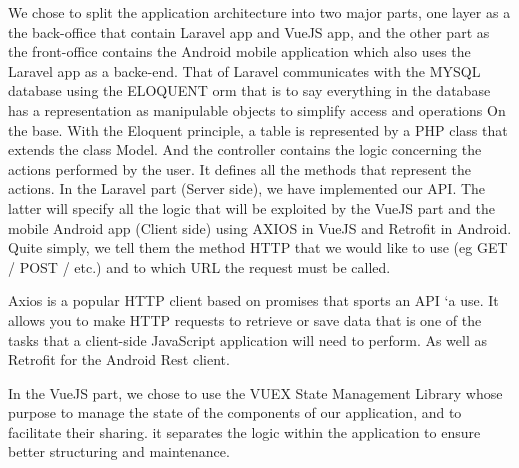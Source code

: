 \documentclass[12pt,a4paper]{report}
\begin{document}
	We chose to split the application architecture into two major parts,
	one layer as a the back-office that contain Laravel app and VueJS app, and the other part as the front-office contains the Android mobile application which also uses the Laravel app as a backe-end. 
	That of Laravel communicates
	with the MYSQL database using the ELOQUENT
	\ac{orm} that is to say everything in the database has a
	representation as manipulable objects to simplify access and operations
	On the base.
	With the Eloquent principle, a table is represented by a PHP class that extends the class
	Model. And the controller contains the logic concerning the actions performed by the user. It
	defines all the methods that represent the actions.
	In the Laravel part (Server side), we have implemented our API. The latter will specify all the logic that will be exploited by
	the VueJS part and the mobile Android app (Client side) using AXIOS in VueJS and Retrofit in Android. Quite simply, we tell them the method
	HTTP that we would like to use (eg GET / POST / etc.) and to which URL the request
	must be called.\par
	Axios is a popular HTTP client based on promises that sports an API `a
	use. It allows you to make HTTP requests to retrieve or save data that
	is one of the tasks that a client-side JavaScript application will need to perform.
	As well as Retrofit for the Android Rest client.\par
	
	In the
	VueJS part, we chose to use the VUEX State Management Library whose purpose
	to manage the state of the components of our application, and to facilitate their sharing.
	it separates the logic within the application to ensure better structuring and maintenance.
	\par
\end{document}
